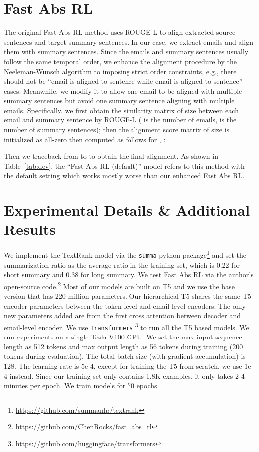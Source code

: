 \section{Fast Abs RL}
\label{appedix:fastabs}
The original Fast Abs RL method \cite{chen2018fast} uses ROUGE-L to align extracted source sentences and target summary sentences. In our case, we extract emails and align them with summary sentences. Since the emails and summary sentences usually follow the same temporal order, we enhance the alignment procedure by the Neeleman-Wunsch algorithm \cite{needleman1970general, rameshkumar2020storytelling} to imposing strict order constraints, e.g., there should not be ``email is aligned to sentence while email is aligned to sentence'' cases. Meanwhile, we modify it to allow one email to be aligned with multiple summary sentences but avoid one summary sentence aligning with multiple emails. Specifically, we first obtain the similarity matrix  of size  between each email and summary sentence by ROUGE-L ( is the number of emails,  is the number of summary sentences); then the alignment score matrix  of size  is initialized as all-zero then computed as follows for , :

Then we traceback from  to  to obtain the final alignment. As shown in Table~\ref{tab:dev}, the ``Fast Abs RL (default)'' model refers to this method with the default setting which works mostly worse than our enhanced Fast Abs RL. 

\section{Experimental Details \& Additional Results}
\label{appedix:exp}
We implement the TextRank \cite{mihalcea2004textrank} model via the \texttt{summa} python package\footnote{\url{https://github.com/summanlp/textrank}} and set the summarization ratio as the average  ratio in the training set, which is 0.22 for short summary and 0.38 for long summary. We test Fast Abs RL \cite{chen2018fast} via the author's open-source code.\footnote{\url{https://github.com/ChenRocks/fast_abs_rl}} Most of our models are built on T5 \cite{raffel2020exploring} and we use the base version that has 220 million parameters. Our hierarchical T5 shares the same T5 encoder parameters between the token-level and email-level encoders. The only new parameters added are from the first cross attention between decoder and email-level encoder. We use \texttt{Transformers} \cite{wolf-etal-2020-transformers}\footnote{\url{https://github.com/huggingface/transformers}} to run all the T5 based models. We run experiments on a single Tesla V100 GPU. We set the max input sequence length as 512 tokens and max output length as 56 tokens during training (200 tokens during evaluation). The total batch size (with gradient accumulation) is 128. The learning rate is 5e-4, except for training the T5 from scratch, we use 1e-4 instead. Since our training set only contains 1.8K examples,  it only takes 2-4 minutes per epoch. We train models for 70 epochs. 

